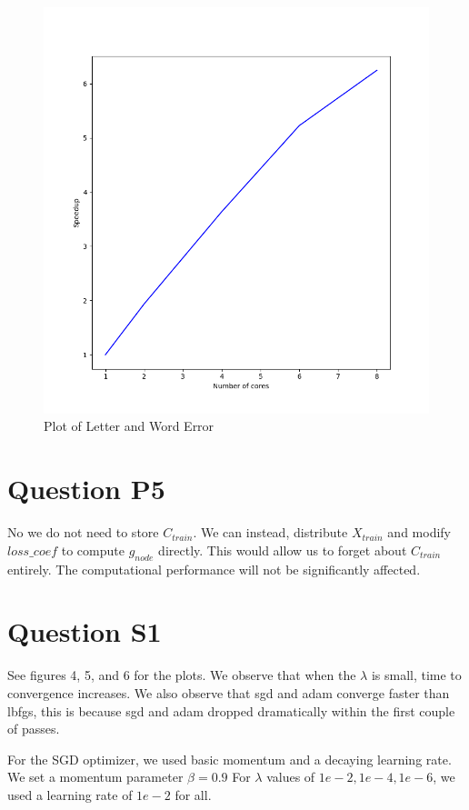 \documentclass[11pt]{report}
\begin{document}
\begin{figure}[b]
\centering
\includegraphics[scale=0.4]{p4_figure.png}
\caption{Plot of Letter and Word Error}
\end{figure}

\section*{Question P5}
No we do not need to store $C_{train}$. We can instead, distribute $X_{train}$
and modify $loss\_coef$ to compute $g_{node}$ directly. This would allow us to
forget about $C_{train}$ entirely. The computational performance will not be 
significantly affected.

\section*{Question S1}
See figures 4, 5, and 6 for the plots. We observe that when the $\lambda$ is 
small, time to convergence increases. We also observe that sgd and adam converge
faster than lbfgs, this is because sgd and adam dropped dramatically within
the first couple of passes.

For the SGD optimizer, we used basic
momentum and a decaying learning rate. We set a momentum parameter $\beta = 0.9$
For $\lambda$ values of $1e-2, 1e-4, 1e-6$, we used a learning rate of $1e-2$ for
all.
\end{document}

